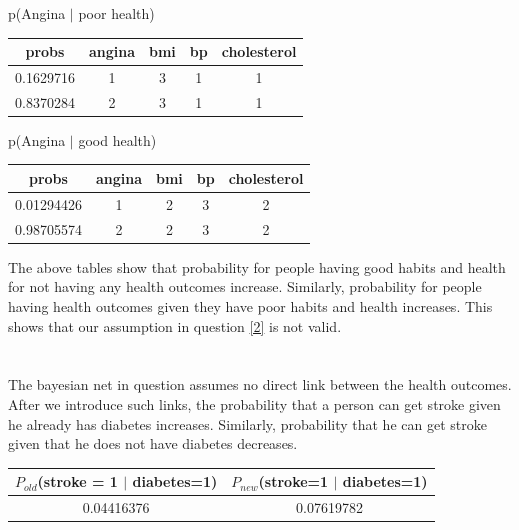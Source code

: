 \documentclass[11pt]{article}
\begin{document}
\clearpage


p(Angina $|$ poor health)

\begin{table}[!hbt]
\begin{center}
\begin{tabular}{ |c|c|c|c|c| }
  \hline
  probs & angina & bmi & bp & cholesterol \\
  \hline
  0.1629716 & 1 & 3 & 1 & 1\\
  \hline
  0.8370284 & 2 & 3 & 1 & 1 \\
  \hline
\end{tabular}
\end{center}
\end{table}
\vspace{-20pt}

p(Angina $|$ good health)

\begin{table}[!hbt]
\begin{center}
\begin{tabular}{ |c|c|c|c|c| }
  \hline
  probs & angina & bmi & bp & cholesterol \\
  \hline
  0.01294426 & 1 & 2 & 3 & 2\\
  \hline
  0.98705574 & 2 & 2 & 3 & 2 \\
  \hline
\end{tabular}
\end{center}
\end{table}

\par The above tables show that probability for people having good habits and health for not having any health outcomes increase. Similarly, probability for people having health outcomes given they have poor habits and health increases. This shows that our assumption in question \ref{2} is not valid.

\section{}
\label{5}

The bayesian net in question \label{2} assumes no direct link between the health outcomes. After we introduce such links, the probability that a person can get stroke given he already has diabetes increases. Similarly, probability that he can get stroke given that he does not have diabetes decreases. 

\begin{table}[!hbt]
\begin{center}
\begin{tabular}{ |c|c| }
  \hline
  $P_{old}$(stroke = 1 $|$ diabetes=1) & $P_{new}$(stroke=1 $|$ diabetes=1) \\
  \hline
  0.04416376 & 0.07619782 \\
  \hline
\end{tabular}
\end{center}
\end{table}
\end{document}
